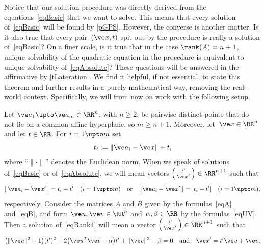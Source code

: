\documentclass[reqno]{amsart}
\begin{document}
Notice that our solution procedure was directly derived from the equations~\eqref{eqBasic} that we want to solve. This means that every solution of~\eqref{eqBasic} will be found by \cref{pGPS}. However, the converse is another matter. Is it also true that every pair~$(\ve x,t)$ spit out by the procedure is really a solution of~\eqref{eqBasic}? On a finer scale, is it true that in the case $\rank(A) = n+1$, unique
solvability of the quadratic equation in the procedure is equivalent to unique solvability
of~\eqref{eqAbsolute}? These questions will be answered in the affirmative by \cref{tLateration}.
We find it helpful, if not essential, to state
this theorem and further results in a purely mathematical way, removing the
real-world context. Specifically, we will from now on work with the
following setup.

\begin{setup} \label{Setup}%
  Let $\ve a_1 \upto \ve a_m \in \RR^n$, with $n \ge 2$, be pairwise
  distinct points that do not lie on a common affine hyperplane, so
  $m \ge n+1$. Moreover, let~$\ve x \in \RR^n$ and let $t \in
  \RR$. For $i = 1 \upto m$ set
  \begin{equation} \label{eqSetup}
    t_i := \lVert\ve a_i - \ve x\rVert + t,
  \end{equation}
  where ``$\lVert\cdot\rVert$'' denotes the Euclidean norm. When we speak of solutions
  of~\eqref{eqBasic} or of~\eqref{eqAbsolute}, we will mean vectors
  $\left(\begin{smallmatrix} t' \\ \ve x'\end{smallmatrix}\right) \in
  \RR^{n+1}$ such that
  \[
    \lVert\ve a_i - \ve x'\rVert = t_i - t' \quad (i = 1 \upto m)
    \quad \text{or} \quad \lVert\ve a_i - \ve x'\rVert = |t_i -
    t'|\quad (i = 1 \upto m),
  \]
  respectively. Consider the matrices $A$ and $B$ given by the
  formulas~\eqref{eqA} and~\eqref{eqB}, and form
  $\ve u,\ve v \in \RR^n$ and~$\alpha,\beta \in \RR$ by the
  formulas~\eqref{eqUV}. Then a solution of~\eqref{eqRank4} will mean
  a vector
  $\left(\begin{smallmatrix} t' \\ \ve x'\end{smallmatrix}\right) \in
  \RR^{n+1}$ such that
  \[
    \bigl(\lVert\ve u\rVert^2-1\bigr) (t')^2 + 2 \bigl(\ve u^T \ve
    v-\alpha\bigr) t' + \lVert\ve v\rVert^2 - \beta = 0 \quad
    \text{and} \quad \ve x' = t' \ve u + \ve v.
  \]
\end{setup}
\end{document}
